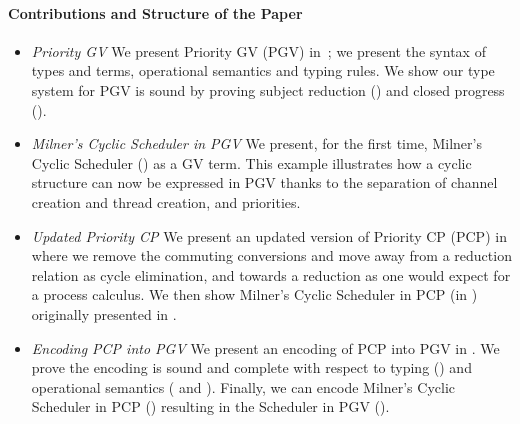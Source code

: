 \documentclass[main.tex]{subfiles}
\begin{document}
\paragraph*{Contributions and Structure of the Paper}
\begin{itemize}
\item \emph{Priority GV} We present Priority GV (PGV) in~; we present the syntax of types and terms, operational semantics and typing rules. We show our type system for PGV is sound by proving subject reduction () and closed progress ().
\item \emph{Milner's Cyclic Scheduler in PGV} We present, for the first time, Milner's Cyclic Scheduler \cite{milner89} () as a GV term. This example illustrates how a cyclic structure can now be expressed in PGV thanks to the separation of channel creation and thread creation, and priorities.
\item \emph{Updated Priority CP} We present an updated version of Priority CP (PCP) \cite{dardhagay18} in  where we remove the commuting conversions and move away from a reduction relation as cycle elimination, and towards a reduction as one would expect for a process calculus. We then show Milner's Cyclic Scheduler in PCP (in ) originally presented in \cite{dardhagay18}.
\item \emph{Encoding PCP into PGV} We present an encoding of PCP into PGV in . We prove the encoding is sound and complete with respect to typing () and operational semantics ( and ). Finally, we can encode Milner's Cyclic Scheduler in PCP () resulting in the Scheduler in PGV ().
\end{itemize}
\end{document}
